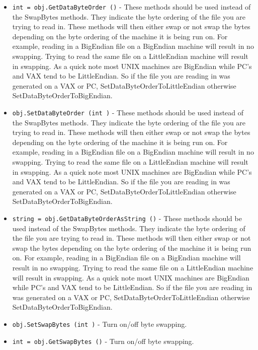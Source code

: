 \begin{itemize}
\item  \verb|int = obj.GetDataByteOrder ()| -  These methods should be used instead of the SwapBytes methods.
 They indicate the byte ordering of the file you are trying
 to read in. These methods will then either swap or not swap
 the bytes depending on the byte ordering of the machine it is
 being run on. For example, reading in a BigEndian file on a
 BigEndian machine will result in no swapping. Trying to read
 the same file on a LittleEndian machine will result in swapping.
 As a quick note most UNIX machines are BigEndian while PC's
 and VAX tend to be LittleEndian. So if the file you are reading
 in was generated on a VAX or PC, SetDataByteOrderToLittleEndian otherwise
 SetDataByteOrderToBigEndian. 

\item  \verb|obj.SetDataByteOrder (int )| -  These methods should be used instead of the SwapBytes methods.
 They indicate the byte ordering of the file you are trying
 to read in. These methods will then either swap or not swap
 the bytes depending on the byte ordering of the machine it is
 being run on. For example, reading in a BigEndian file on a
 BigEndian machine will result in no swapping. Trying to read
 the same file on a LittleEndian machine will result in swapping.
 As a quick note most UNIX machines are BigEndian while PC's
 and VAX tend to be LittleEndian. So if the file you are reading
 in was generated on a VAX or PC, SetDataByteOrderToLittleEndian otherwise
 SetDataByteOrderToBigEndian. 

\item  \verb|string = obj.GetDataByteOrderAsString ()| -  These methods should be used instead of the SwapBytes methods.
 They indicate the byte ordering of the file you are trying
 to read in. These methods will then either swap or not swap
 the bytes depending on the byte ordering of the machine it is
 being run on. For example, reading in a BigEndian file on a
 BigEndian machine will result in no swapping. Trying to read
 the same file on a LittleEndian machine will result in swapping.
 As a quick note most UNIX machines are BigEndian while PC's
 and VAX tend to be LittleEndian. So if the file you are reading
 in was generated on a VAX or PC, SetDataByteOrderToLittleEndian otherwise
 SetDataByteOrderToBigEndian. 

\item  \verb|obj.SetSwapBytes (int )| -  Turn on/off byte swapping.

\item  \verb|int = obj.GetSwapBytes ()| -  Turn on/off byte swapping.


\end{itemize}
